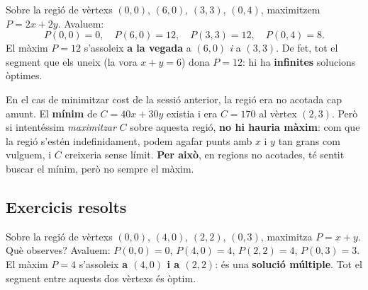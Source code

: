 \begin{exemple}
Sobre la regió de vèrtexs $(0,0)$, $(6,0)$, $(3,3)$, $(0,4)$, maximitzem
$P=2x+2y$. Avaluem:
\[
P(0,0)=0,\quad P(6,0)=12,\quad P(3,3)=12,\quad P(0,4)=8.
\]
El màxim $P=12$ s'assoleix \textbf{a la vegada} a $(6,0)$ \emph{i} a $(3,3)$. De fet,
tot el segment que els uneix (la vora $x+y=6$) dona $P=12$: hi ha \textbf{infinites}
solucions òptimes.

\begin{center}

\end{center}
\end{exemple}

\begin{exemple}
En el cas de minimitzar cost de la sessió anterior, la regió era no acotada cap amunt.
El \textbf{mínim} de $C=40x+30y$ existia i era $C=170$ al vèrtex $(2,3)$. Però si
intentéssim \emph{maximitzar} $C$ sobre aquesta regió, \textbf{no hi hauria màxim}:
com que la regió s'estén indefinidament, podem agafar punts amb $x$ i $y$ tan grans
com vulguem, i $C$ creixeria sense límit. \textbf{Per això}, en regions no acotades,
té sentit buscar el mínim, però no sempre el màxim.
\end{exemple}

\subsection{Exercicis resolts}

\begin{exresolt}
Sobre la regió de vèrtexs $(0,0)$, $(4,0)$, $(2,2)$, $(0,3)$, maximitza $P=x+y$. Què
observes?
\solucio
Avaluem: $P(0,0)=0$, $P(4,0)=4$, $P(2,2)=4$, $P(0,3)=3$. El màxim $P=4$ s'assoleix
\textbf{a $(4,0)$ i a $(2,2)$}: és una \textbf{solució múltiple}. Tot el segment entre
aquests dos vèrtexs és òptim.
\end{exresolt}

